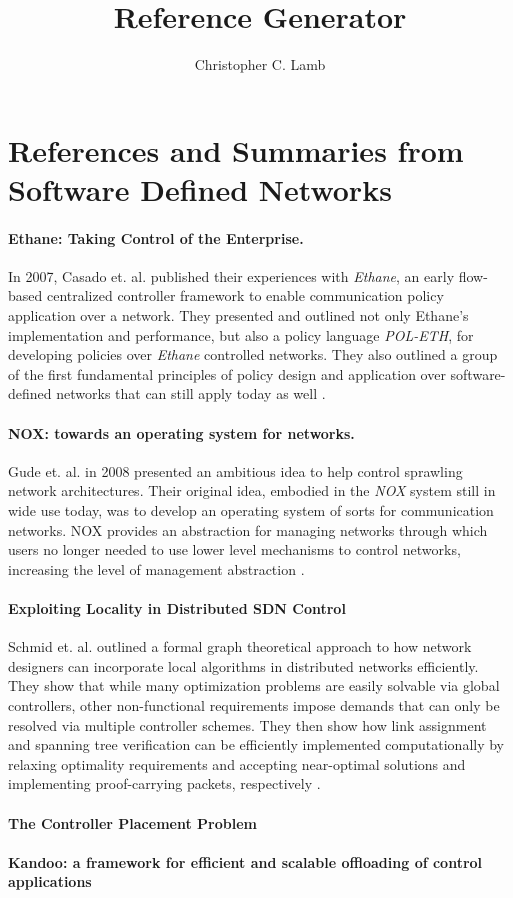 \documentclass[10pt,letterpaper]{article}
\author{Christopher C. Lamb}
\title{Reference Generator}
\begin{document}
\section{References and Summaries from Software Defined Networks}

\paragraph{Ethane: Taking Control of the Enterprise.} In 2007, Casado et. al. published their experiences with {\sl Ethane}, an early flow-based centralized controller framework to enable communication policy application over a network.  They presented and outlined not only Ethane's implementation and performance, but also a policy language {\sl POL-ETH}, for developing policies over {\sl Ethane} controlled networks.  They also outlined a group of the first fundamental principles of policy design and application over software-defined networks that can still apply today as well \cite{CaFrPeLu:07}.

\paragraph{NOX: towards an operating system for networks.}  Gude et. al. in 2008 presented an ambitious idea to help control sprawling network architectures.  Their original idea, embodied in the {\sl NOX} system still in wide use today, was to develop an operating system of sorts for communication networks.  NOX provides an abstraction for managing networks through which users no longer needed to use lower level mechanisms to control networks, increasing the level of management abstraction \cite{GuKoPePf:08}.

\paragraph{Exploiting Locality in Distributed SDN Control} Schmid et. al. outlined a formal graph theoretical approach to how network designers can incorporate local algorithms in distributed networks efficiently.  They show that while many optimization problems are easily solvable via global controllers, other non-functional requirements impose demands that can only be resolved via multiple controller schemes. They then show how link assignment and spanning tree verification can be efficiently implemented computationally by relaxing optimality requirements and accepting near-optimal solutions and implementing proof-carrying packets, respectively \cite{ScSu:13}.

\paragraph{The Controller Placement Problem}

\cite{HeShMc:12}

\paragraph{Kandoo: a framework for efficient and scalable offloading of control applications}

\cite{HaGa:12}



\end{document}
